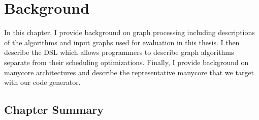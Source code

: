 \chapter{Background}\label{gen:sec:background}

In this chapter, I provide background on graph processing including descriptions of the algorithms and input graphs used for evaluation in this thesis.
I then describe the \graphit DSL which allows programmers to describe graph algorithms separate from their scheduling optimizations.
Finally, I provide background on manycore architectures and describe the representative manycore that we target with our code generator. 







\section{Chapter Summary}